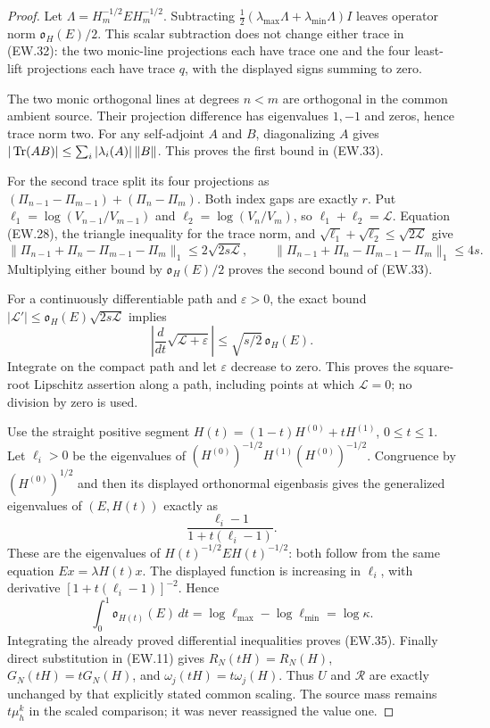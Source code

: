 \begin{proof}
Let $\Lambda=H_m^{-1/2}EH_m^{-1/2}$. Subtracting
$\tfrac12(\lambda_{\max}\Lambda+\lambda_{\min}\Lambda)I$
leaves operator norm $\mathfrak o_H(E)/2$. This scalar subtraction
does not change either trace in (EW.32): the two monic-line
projections each have trace one and the four least-lift projections
each have trace $q$, with the displayed signs summing to zero.

The two monic orthogonal lines at degrees $n<m$ are orthogonal
in the common ambient source. Their projection difference has
eigenvalues $1,-1$ and zeros, hence trace norm two. For any
self-adjoint $A$ and $B$, diagonalizing $A$ gives
$|\operatorname{Tr}(AB)|\le\sum_i|\lambda_i(A)|\,\|B\|$.
This proves the first bound in (EW.33).

For the second trace split its four projections as
$(\Pi_{n-1}-\Pi_{m-1})+(\Pi_n-\Pi_m)$. Both index gaps
are exactly $r$. Put
$\ell_1=\log(V_{n-1}/V_{m-1})$ and
$\ell_2=\log(V_n/V_m)$, so $\ell_1+\ell_2=\mathscr L$.
Equation (EW.28), the triangle inequality for the trace norm, and
$\sqrt{\ell_1}+\sqrt{\ell_2}\le\sqrt{2\mathscr L}$ give
\[
 \|\Pi_{n-1}+\Pi_n-\Pi_{m-1}-\Pi_m\|_1
 \le 2\sqrt{2s\mathscr L},\qquad
 \|\Pi_{n-1}+\Pi_n-\Pi_{m-1}-\Pi_m\|_1\le4s.
\]
Multiplying either bound by $\mathfrak o_H(E)/2$ proves the
second bound of (EW.33).

For a continuously differentiable path and $\varepsilon>0$, the exact bound
$|\mathscr L'|\le\mathfrak o_H(E)\sqrt{2s\mathscr L}$ implies
\[
 \left|\frac d{dt}\sqrt{\mathscr L+\varepsilon}\right|
 \le\sqrt{s/2}\,\mathfrak o_H(E).
\]
Integrate on the compact path and let $\varepsilon$ decrease to
zero. This proves the square-root Lipschitz assertion along a path,
including points at which $\mathscr L=0$; no division by zero is
used.

Use the straight positive segment
$H(t)=(1-t)H^{(0)}+tH^{(1)}$, $0\le t\le1$.
Let $\ell_i>0$ be the eigenvalues of
$(H^{(0)})^{-1/2}H^{(1)}(H^{(0)})^{-1/2}$.
Congruence by $(H^{(0)})^{1/2}$ and then its displayed orthonormal
eigenbasis gives the generalized eigenvalues of $(E,H(t))$ exactly
as
\[
 \frac{\ell_i-1}{1+t(\ell_i-1)}.
\]
These are the eigenvalues of $H(t)^{-1/2}EH(t)^{-1/2}$:
both follow from the same equation $Ex=\lambda H(t)x$.
The displayed function is increasing in $\ell_i$, with derivative
$[1+t(\ell_i-1)]^{-2}$. Hence
\[
 \int_0^1\mathfrak o_{H(t)}(E)\,dt
 =\log\ell_{\max}-\log\ell_{\min}=\log\kappa.
\]
Integrating the already proved differential inequalities proves
(EW.35). Finally direct substitution in (EW.11) gives
$R_N(tH)=R_N(H)$, $G_N(tH)=tG_N(H)$, and
$\omega_j(tH)=t\omega_j(H)$. Thus $U$ and $\mathscr R$ are
exactly unchanged by that explicitly stated common scaling. The
source mass remains $t\mu_h^k$ in the scaled comparison; it was
never reassigned the value one.
\end{proof}


